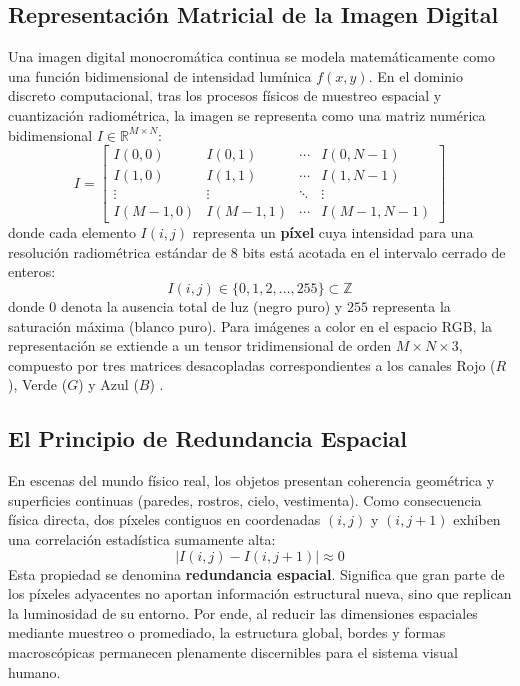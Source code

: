 \documentclass{article}
\begin{document}
\subsection{Representación Matricial de la Imagen Digital}
Una imagen digital monocromática continua se modela matemáticamente como una función bidimensional de intensidad lumínica $f(x, y)$. En el dominio discreto computacional, tras los procesos físicos de muestreo espacial y cuantización radiométrica, la imagen se representa como una matriz numérica bidimensional $I \in \mathbb{R}^{M \times N}$:
\begin{equation}
    I = \begin{bmatrix}
        I(0, 0) & I(0, 1) & \cdots & I(0, N-1) \\
        I(1, 0) & I(1, 1) & \cdots & I(1, N-1) \\
        \vdots & \vdots & \ddots & \vdots \\
        I(M-1, 0) & I(M-1, 1) & \cdots & I(M-1, N-1)
    \end{bmatrix}
\end{equation}
donde cada elemento $I(i, j)$ representa un \textbf{píxel} cuya intensidad para una resolución radiométrica estándar de 8 bits está acotada en el intervalo cerrado de enteros:
\begin{equation}
    I(i, j) \in \{0, 1, 2, \dots, 255\} \subset \mathbb{Z}
\end{equation}
donde $0$ denota la ausencia total de luz (negro puro) y $255$ representa la saturación máxima (blanco puro). Para imágenes a color en el espacio RGB, la representación se extiende a un tensor tridimensional de orden $M \times N \times 3$, compuesto por tres matrices desacopladas correspondientes a los canales Rojo ($R$), Verde ($G$) y Azul ($B$) \cite{jain1989fundamentals}.

\subsection{El Principio de Redundancia Espacial}
En escenas del mundo físico real, los objetos presentan coherencia geométrica y superficies continuas (paredes, rostros, cielo, vestimenta). Como consecuencia física directa, dos píxeles contiguos en coordenadas $(i, j)$ y $(i, j+1)$ exhiben una correlación estadística sumamente alta:
\begin{equation}
    |I(i, j) - I(i, j+1)| \approx 0
\end{equation}
Esta propiedad se denomina \textbf{redundancia espacial}. Significa que gran parte de los píxeles adyacentes no aportan información estructural nueva, sino que replican la luminosidad de su entorno. Por ende, al reducir las dimensiones espaciales mediante muestreo o promediado, la estructura global, bordes y formas macroscópicas permanecen plenamente discernibles para el sistema visual humano.
\end{document}
